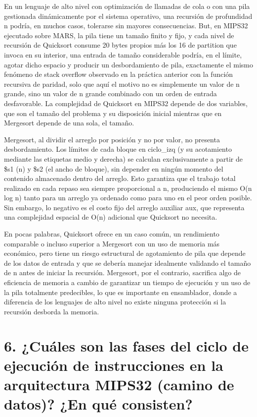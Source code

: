 \documentclass[12pt, letterpaper]{article}
\begin{document}
En un lenguaje de alto nivel con optimización de llamadas de cola o con una pila gestionada dinámicamente por el sistema operativo, una recursión de profundidad n podría, en muchos casos, tolerarse sin mayores consecuencias. But, en MIPS32 ejecutado sobre MARS, la pila tiene un tamaño finito y fijo, y cada nivel de recursión de Quicksort consume 20 bytes propios más los 16 de partition que invoca en su interior, una entrada de tamaño considerable podría, en el límite, agotar dicho espacio y producir un desbordamiento de pila, exactamente el mismo fenómeno de stack overflow observado en la práctica anterior con la función recursiva de paridad, solo que aquí el motivo no es simplemente un valor de n grande, sino un valor de n grande combinado con un orden de entrada desfavorable. La complejidad de Quicksort en MIPS32 depende de dos variables, que son el tamaño del problema y su disposición inicial mientras que en Mergesort depende de una sola, el tamaño.

Mergesort, al dividir el arreglo por posición y no por valor, no presenta desbordamiento. Los límites de cada bloque en ciclo\_izq (y su acotamiento mediante las etiquetas medio y derecha) se calculan exclusivamente a partir de \$s1 (n) y \$s2 (el ancho de bloque), sin depender en ningún momento del contenido almacenado dentro del arreglo. Esto garantiza que el trabajo total realizado en cada repaso sea siempre proporcional a n, produciendo el mismo O(n log n) tanto para un arreglo ya ordenado como para uno en el peor orden posible. Sin embargo, lo negativo es el costo fijo del arreglo auxiliar aux, que representa una complejidad espacial de O(n) adicional que Quicksort no necesita.

En pocas palabras, Quicksort ofrece en un caso común, un rendimiento comparable o incluso superior a Mergesort con un uso de memoria más económico, pero tiene un riesgo estructural de agotamiento de pila que depende de los datos de entrada y que se debería manejar idealmente validando el tamaño de n antes de iniciar la recursión. Mergesort, por el contrario, sacrifica algo de eficiencia de memoria a cambio de garantizar un tiempo de ejecución y un uso de la pila totalmente predecibles, lo que es importante en ensamblador, donde a diferencia de los lenguajes de alto nivel no existe ninguna protección si la recursión desborda la memoria.\newpage

\section*{6. ¿Cuáles son las fases del ciclo de ejecución de instrucciones en la arquitectura MIPS32 (camino de datos)? ¿En qué consisten?}
\end{document}
